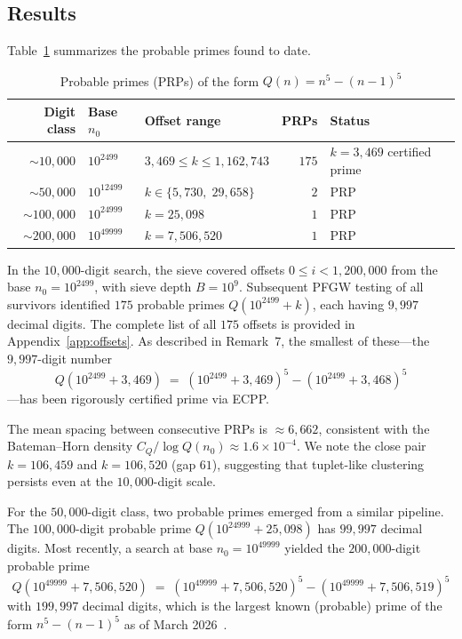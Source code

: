 \documentclass[11pt,a4paper]{article}
\theoremstyle{plain}
\theoremstyle{definition}
\theoremstyle{remark}
\begin{document}
\subsection{Results}

Table~\ref{tab:largePRP} summarizes the probable primes found to date.

\begin{table}[ht]
\centering
\caption{Probable primes (PRPs) of the form $Q(n) = n^5 - (n-1)^5$}
\label{tab:largePRP}
\smallskip
\begin{tabular}{@{}rllrl@{}}
\toprule
Digit class & Base $n_0$ & Offset range & PRPs & Status \\
\midrule
$\sim 10{,}000$ & $10^{2499}$ & $3{,}469 \le k \le 1{,}162{,}743$ & $175$ & $k=3{,}469$ certified prime \\
$\sim 50{,}000$ & $10^{12499}$ & $k \in \{5{,}730,\; 29{,}658\}$ & $2$ & PRP \\
$\sim 100{,}000$ & $10^{24999}$ & $k = 25{,}098$ & $1$ & PRP \\
$\sim 200{,}000$ & $10^{49999}$ & $k = 7{,}506{,}520$ & $1$ & PRP \\
\bottomrule
\end{tabular}
\end{table}

In the $10{,}000$-digit search, the sieve covered offsets $0 \le i < 1{,}200{,}000$ from the base $n_0 = 10^{2499}$, with sieve depth $B = 10^9$. Subsequent PFGW testing of all survivors identified $175$ probable primes $Q(10^{2499}+k)$, each having $9{,}997$ decimal digits. The complete list of all $175$ offsets is provided in Appendix~\ref{app:offsets}. As described in Remark~7, the smallest of these---the $9{,}997$-digit number
\[
Q(10^{2499} + 3{,}469) \;=\; (10^{2499} + 3{,}469)^5 - (10^{2499} + 3{,}468)^5
\]
---has been rigorously certified prime via ECPP.

The mean spacing between consecutive PRPs is $\approx 6{,}662$, consistent with the Bateman--Horn density $C_Q / \!\log Q(n_0) \approx 1.6 \times 10^{-4}$. We note the close pair $k = 106{,}459$ and $k = 106{,}520$ (gap $61$), suggesting that tuplet-like clustering persists even at the $10{,}000$-digit scale.

For the $50{,}000$-digit class, two probable primes emerged from a similar pipeline. The $100{,}000$-digit probable prime $Q(10^{24999} + 25{,}098)$ has $99{,}997$ decimal digits. Most recently, a search at base $n_0 = 10^{49999}$ yielded the $200{,}000$-digit probable prime
\[
Q(10^{49999} + 7{,}506{,}520) \;=\; (10^{49999} + 7{,}506{,}520)^5 - (10^{49999} + 7{,}506{,}519)^5
\]
with $199{,}997$ decimal digits, which is the largest known (probable) prime of the form $n^5 - (n-1)^5$ as of March 2026~\cite{primepages}.
\end{document}
